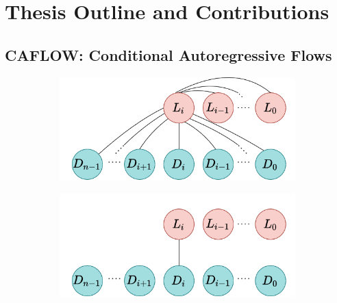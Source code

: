 
\chapter{Thesis Outline and Contributions}

\section{CAFLOW: Conditional Autoregressive Flows}

\begin{figure}[h]
    \centering
       \begin{subfigure}{0.31\textwidth}
            \includegraphics[width=\textwidth]{Outline/figures/caflow/fulldependencies.png}
        \end{subfigure}%
        \quad
    \begin{subfigure}{0.31\textwidth}
        \includegraphics[width=\textwidth]{Outline/figures/caflow/Dual-Glowdependencies.png} 
    \end{subfigure}%
    \quad 
    \begin{subfigure}{0.31\textwidth}

\end{subfigure}
\end{figure}
